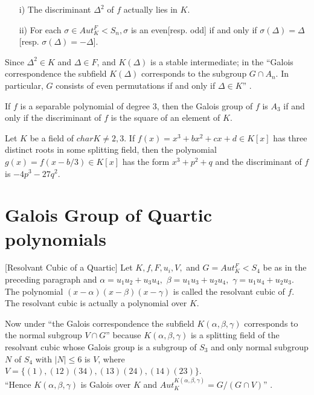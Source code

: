 \clearpage
\begin{theorem}
\begin{enumerate}  \cite{hunger}
\item[i)] The discriminant \({\Delta}^2\) of \(f\) actually lies in \(K\).
  \item[ii)] For each \(\sigma \in Aut_K^F < S_n, \sigma\) is an even[resp. odd] if and only if \(\sigma(\Delta) = \Delta\)[resp. \(\sigma(\Delta) = - \Delta\)].
  \end{enumerate}
\end{theorem}
\vspace{2mm}
Since \({\Delta}^2 \in K\) and \(\Delta \in F\), and \(K(\Delta)\) is a stable intermediate; in the ``Galois correspondence the subfield \(K(\Delta)\) corresponds to the subgroup \(G \cap A_n\). In particular, \(G\) consists of even permutations if and only if \(\Delta \in K\)'' \cite{hunger}.
\vspace{3mm}

\begin{corollary} \cite{hunger}
  If \(f\) is a separable polynomial of degree \(3\), then the Galois group of \(f\) is \(A_3\) if and only if the discriminant of \(f\) is the square of an element of \(K\).
\end{corollary}
\vspace{3mm}
\begin{theorem} \cite{hunger}
  Let \(K\) be a field of \(char K \neq 2,3 \). If \(f(x)=x^3+bx^2+cx+d \in K[x]\) has three distinct roots in some splitting field, then the polynomial \(g(x)=f(x-b/3) \in K[x]\) has the form \(x^3+p^2+q\) and the discriminant of \(f\) is \(-4p^3-27q^2\).
\end{theorem}
\vspace{3mm}
\section{Galois Group of Quartic polynomials}
\begin{definition} \cite{hunger} [Resolvant Cubic of a Quartic]
Let \(K, f, F, u_i, V,\) and \(G=Aut_K^F<S_4\) be as in the preceding paragraph and \(\alpha=u_1u_2+u_3u_4,\) \(\beta=u_1u_3+u_2u_4,\) \(\gamma=u_1u_4+u_2u_3\).
The polynomial \( (x- \alpha)(x- \beta)(x- \gamma) \) is called the resolvant cubic of \(f\). The resolvant cubic is actually a polynomial over \(K\).
\end{definition}

Now under ``the Galois correspondence the subfield \(K(\alpha, \beta, \gamma)\) corresponds to the normal subgroup \(V \cap G\)'' \cite{hunger} because \(K(\alpha,\beta,\gamma)\) is a splitting field of the resolvant cubic whose Galois group is a subgroup of \(S_3\) and only normal subgroup \(N\) of \(S_4\) with \(|N| \leq 6\) is \(V\), where \(V=\{(1),(12)(34),(13)(24),(14)(23)\}\).\\
``Hence \(K(\alpha, \beta, \gamma)\) is Galois over \(K\) and \(Aut_K^{K(\alpha, \beta, \gamma)} = G/(G \cap V)\)'' \cite{hunger}.

